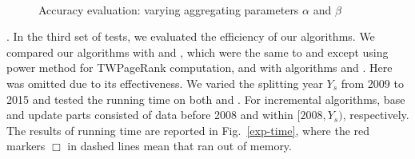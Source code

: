 \newcommand{\graphscaleexpapp}{0.24}
\newcommand{\graphmarginexpapp}{3ex}
\begin{figure}[tb!]
\addtolength{\subfigcapskip}{-1ex}
\begin{center}
\hspace{\graphmarginexpapp}
{}
\hspace{\graphmarginexpapp}
{}
\\ %
\vspace{-2ex}
\hspace{\graphmarginexpapp}
{}
\hspace{\graphmarginexpapp}
{}
\end{center}
\vspace{-1.5ex}
\caption{\small Accuracy evaluation: varying aggregating parameters $\alpha$ and $\beta$}
\label{exp-ab}
\vspace{-2ex}
\end{figure}


.
In the third set of tests, we evaluated the efficiency of our algorithms.
%
We compared our algorithms with \powtwprscc and \powensemble, which were the same to \twprscc and \batensemble except using power method for TWPageRank computation, and with algorithms \futurerank and \hhgrank.
Here \pagerank was omitted due to its effectiveness.
%
We varied the splitting year $Y_s$ from 2009 to 2015 and tested the running time on both \aminer and \magdata.
%
For incremental algorithms, base and update parts consisted of data before 2008 and within $[2008, Y_s)$, respectively.
%
The results of running time are reported in Fig.~\ref{exp-time}, where the red markers $\Box$ in dashed lines mean that \hhgrank ran out of memory.

